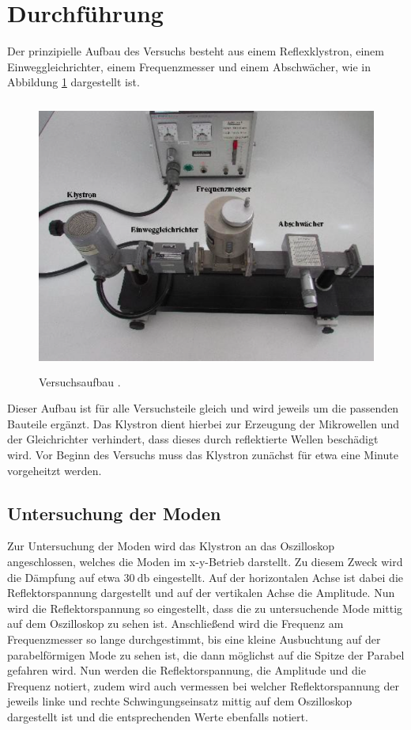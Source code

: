 \section{Durchführung}
\label{sec:Durchführung}
Der prinzipielle Aufbau des Versuchs besteht aus einem Reflexklystron, einem
Einweggleichrichter, einem Frequenzmesser und einem Abschwächer, wie in Abbildung
\ref{fig:aufbau} dargestellt ist.
\begin{figure}[H]
  \centering
  \includegraphics[height=9cm]{Aufbau.png}
  \caption{Versuchsaufbau \cite{skript}.}
  \label{fig:aufbau}
\end{figure}
Dieser Aufbau ist für alle Versuchsteile gleich und wird jeweils um die passenden
Bauteile ergänzt. Das Klystron dient hierbei zur Erzeugung der Mikrowellen und der
Gleichrichter verhindert, dass dieses durch reflektierte Wellen beschädigt wird.
Vor Beginn des Versuchs muss das Klystron zunächst für etwa eine Minute vorgeheitzt
werden.

\subsection{Untersuchung der Moden}
Zur Untersuchung der Moden wird das Klystron an das Oszilloskop angeschlossen, welches
die Moden im x-y-Betrieb darstellt. Zu diesem Zweck wird die Dämpfung auf etwa
$\SI{30}{\decibel}$ eingestellt. Auf der horizontalen Achse ist dabei die Reflektorspannung
dargestellt und auf der vertikalen Achse die Amplitude. Nun wird die Reflektorspannung
so eingestellt, dass die zu untersuchende Mode mittig auf dem Oszilloskop zu sehen ist.
Anschließend wird die Frequenz am Frequenzmesser so lange durchgestimmt, bis eine kleine
Ausbuchtung auf der parabelförmigen Mode zu sehen ist, die dann möglichst auf die
Spitze der Parabel gefahren wird. Nun werden die Reflektorspannung, die Amplitude und
die Frequenz notiert, zudem wird auch vermessen bei welcher Reflektorspannung der jeweils
linke und rechte Schwingungseinsatz mittig auf dem Oszilloskop dargestellt ist und die
entsprechenden Werte ebenfalls notiert. \\

